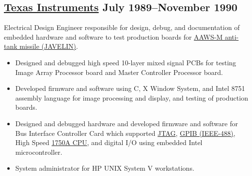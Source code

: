 \documentclass[10pt,letterpaper,oneside]{report}
\begin{document}
\medskip

\begin{minipage}{\textwidth}
  \subsection[Texas Instruments]{
    {\href{http://www.ti.com/}{Texas Instruments} \hfill July 1989--November 1990}
  }

  Electrical Design Engineer responsible for design, debug, and documentation of
  embedded hardware and software to test production boards for
  \href{http://www.army-technology.com/projects/javelin/}{AAWS-M anti-tank
  missile (JAVELIN)}.

  \begin{itemize}
    \item Designed and debugged high speed 10-layer mixed signal PCBs for
      testing Image Array Processor board and Master Controller Processor board.

    \item Developed firmware and software using C, X Window System, and Intel
      8751 assembly language for image processing and display, and testing of
      production boards.

    \item Designed and debugged hardware and developed firmware and software for
      Bus Interface Controller Card which supported
      \href{http://www.ti.com/lit/an/ssya002c/ssya002c.pdf}{JTAG},
      \href{http://en.wikipedia.org/wiki/IEEE_488}{GPIB (IEEE-488)}, High Speed
      \href{http://www.pyramidsemiconductor.com/download/P1750A.pdf}{1750A CPU},
      and digital I/O using embedded Intel microcontroller.

    \item System administrator for HP UNIX System V workstations.
  \end{itemize}
\end{minipage}

\medskip
\end{document}
